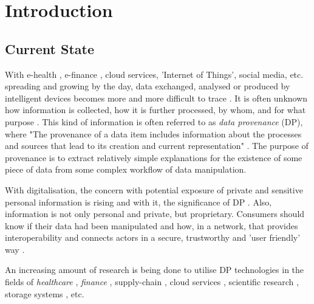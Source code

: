 
\chapter{Introduction}
\label{ch:Introduction}

\section{Current State}
\label{sec:currentstate}

With e-health \cite{what_is_e_health}, e-finance \cite{e_finance_introduction}, cloud services, ’Internet of Things’, social media, etc. spreading and growing by the day, data exchanged, analysed or produced by intelligent devices becomes more and more difficult to trace \cite{IoT_difficult_to_trace}. It is often unknown how information is collected, how it is further processed, by whom, and for what purpose \cite{how_info_is_collected}. This kind of information is often referred to as \textit{data provenance} (DP), where "The provenance of a data item includes information about the processes and sources that lead to its creation and current representation" \cite[p.~3]{DP_categorisation_of_appr}. The purpose of provenance is to extract relatively simple explanations for the existence of some piece of data from some complex workflow of data manipulation. 

With digitalisation, the concern with potential exposure of private and sensitive personal information is rising \cite{digitalisation} and with it, the significance of DP \cite{DP_whats_next}. Also, information is not only personal and private, but proprietary. Consumers should know if their data had been manipulated and how, in a network, that provides interoperability and connects actors in a secure, trustworthy and 'user friendly' way \cite{consumers_should_know}.

An increasing amount of research is being done to utilise DP technologies \cite{DP_whats_next} in the fields of \textit{healthcare} \cite{health_1,health_2,health_3,health_4,health_5,consumers_should_know}, \textit{finance} \cite{finance_1,finance_2,finance_3,finance_4}, supply-chain \cite{DP_supply_chain}, cloud services \cite{health_cloud_service}, scientific research \cite{DP_e_science}, storage systems \cite{DP_storagesys}, etc. 

